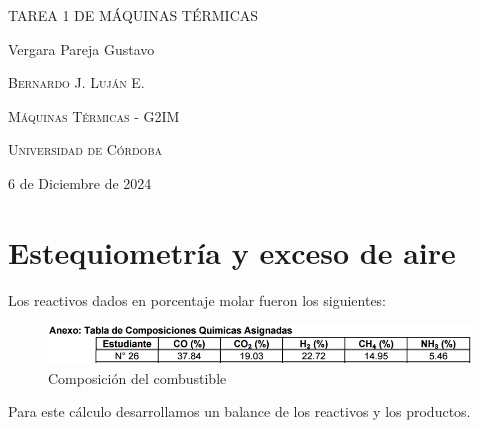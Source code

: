 \documentclass{article}
\author{Gustavo Vergara}
\theoremstyle{mytheoremstyle}
\theoremstyle{mytheoremstyle}
\theoremstyle{myproblemstyle}
\begin{document}
\pgfplotsset{compat=1.18}

\begin{titlepage}
	\centering
	\vspace{2.5cm}
	{\scshape \Large TAREA 1 DE MÁQUINAS TÉRMICAS\par}
	\vspace{5cm}
	\textbf\large\scshape{\par}
	\vspace{0.5cm}
	{\Large Vergara Pareja Gustavo\par}
	\vspace{5cm}
	{\scshape\Large Bernardo J. Luján E. \par}
	\vspace{0.3cm}
	{\scshape\Large Máquinas Térmicas - G2IM \par}
	\vspace{0.3cm}
	{\scshape\Large Universidad de Córdoba\par}
	\vspace{0.3cm}
	{\Large 6 de Diciembre de 2024 \par}
\end{titlepage}
\tableofcontents
\newpage
    \section{Estequiometría y exceso de aire}
    Los reactivos dados en porcentaje molar fueron los siguientes:
    \begin{figure}[h!] %
        \centering
        \includegraphics[width=1\textwidth]{comp.png} %
        \caption{Composición del combustible}
        \label{fig:mi_imagen}
    \end{figure}

    Para este cálculo desarrollamos un balance de los reactivos y los productos. 
    
\end{document}

